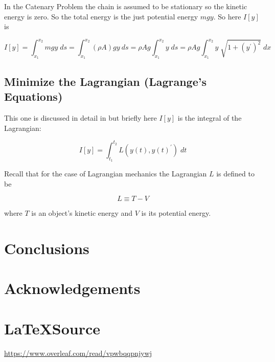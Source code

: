 \documentclass{article}
\theoremstyle{definition}
\begin{document}
\bigskip
\noindent
In the Catenary Problem the chain is assumed to be stationary so
the kinetic energy is zero. So the total energy is the just
potential energy $mgy$. So here $I[y]$ is


\bigskip
\begin{equation*}
I[y]
= \int_{x_1}^{x_2} mgy \; ds
= \int_{x_1}^{x_2} (\rho A) g y \: ds 
= \rho A g \int_{x_1}^{x_2} y \; ds 
= \rho A g\int_{x_1}^{x_2} y \; \sqrt{1 + (y^{\prime})^2} \; dx
\end{equation*}

\medskip
\subsection{Minimize the Lagrangian (Lagrange's Equations)}
This one is discussed in detail in \cite{notes:pola} but briefly
here $I[y]$ is the integral of the Lagrangian:


\bigskip
\begin{equation*}
I[y] = \int_{t_1}^{t_2} L(y(t),y(t)^{\prime}) \; dt
\end{equation*}


\bigskip
\noindent
\bigskip
Recall that for the case of Lagrangian mechanics 
the Lagrangian $L$ is defined to be

\begin{equation*}
L \equiv T - V
\end{equation*}

\bigskip
\noindent
where $T$ is an object's kinetic energy and $V$ 
is its potential energy. 
%
%
%
\section{Conclusions}
%
%
%
\section*{Acknowledgements}
%
%
\section*{\LaTeX Source}
\url{https://www.overleaf.com/read/vpwbqqpnjywj}
%
%
%


%
%
\end{document}
